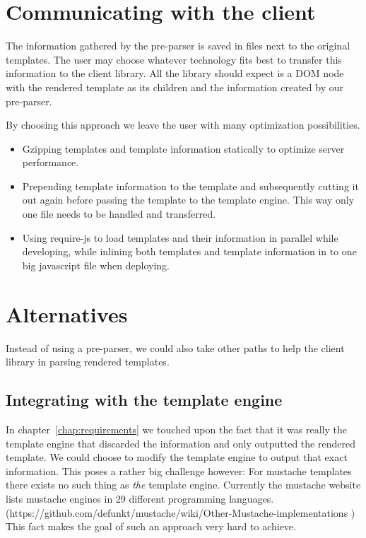 \documentclass[thesis.tex]{subfiles}
\begin{document}
\section{Communicating with the client}

The information gathered by the pre-parser is saved in files next to the
original templates. The user may choose whatever technology fits best to
transfer this information to the client library. All the library should expect
is a DOM node with the rendered template as its children and the information
created by our pre-parser.

By choosing this approach we leave the user with many optimization
possibilities.
\begin{itemize}
\item Gzipping templates and template information statically to optimize
      server performance.
\item Prepending template information to the template and subsequently
      cutting it out again before passing the template to the template
      engine. This way only one file needs to be handled and transferred.
\item Using require-js to load templates and their information in parallel
      while developing, while inlining both templates and template information
      in to one big javascript file when deploying.
\end{itemize}

\section{Alternatives}

Instead of using a pre-parser, we could also take other paths to help
the client library in parsing rendered templates.

\subsection{Integrating with the template engine}

In chapter~\ref{chap:requirements} we touched upon the fact that it was really
the template engine that discarded the information and only outputted the
rendered template. We could choose to modify the template engine to output that
exact information. This poses a rather big challenge however:
For mustache templates there exists no such thing as \emph{the} template engine.
Currently the mustache website lists mustache engines in 29 different
programming languages. (https://github.com/defunkt/mustache/wiki/Other-Mustache-implementations )
This fact makes the goal of such an approach very hard to achieve.
\end{document}
